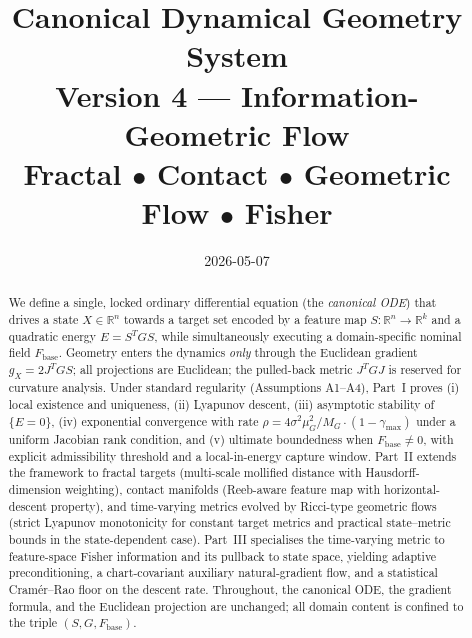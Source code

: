 \documentclass[11pt,oneside]{amsart}
\def\textbf#1{#1}%
\def\textmd#1{#1}%
\theoremstyle{plain}
\theoremstyle{definition}
\newcommand{\gX}{g_X}
\newcommand{\Fbase}{F_{\mathrm{base}}}
\newcommand{\R}{\mathbb{R}}
\begin{document}

\title[Canonical Dynamical Geometry System v4]{%
  \textbf{Canonical Dynamical Geometry System}\\[2pt]
  {\large Version 4 --- Information-Geometric Flow}\\[4pt]
  {\normalsize\textmd{Fractal $\bullet$ Contact $\bullet$ Geometric Flow $\bullet$ Fisher}}
}
\author{} \date{2026-05-07}

\begin{abstract}
We define a single, locked ordinary differential equation (the
\emph{canonical ODE}) that drives a state $X\in\R^{n}$ towards a target set
encoded by a feature map $S:\R^{n}\!\to\!\R^{k}$ and a quadratic energy
$E = S^{T}GS$, while simultaneously executing a domain-specific nominal
field $\Fbase$. Geometry enters the dynamics \emph{only} through the
Euclidean gradient $\gX = 2J^{T}GS$; all projections are Euclidean; the
pulled-back metric $J^{T}GJ$ is reserved for curvature analysis. Under
standard regularity (Assumptions A1--A4), Part~I proves (i) local
existence and uniqueness, (ii) Lyapunov descent, (iii) asymptotic
stability of $\{E=0\}$, (iv) exponential convergence with rate
$\rho = 4\sigma^{2}\mu_{G}^{2}/M_{G}\cdot(1-\gamma_{\max})$ under a
uniform Jacobian rank condition, and (v) ultimate boundedness when
$\Fbase\neq 0$, with explicit admissibility threshold and a local-in-energy
capture window. Part~II extends
the framework to fractal targets (multi-scale mollified distance with
Hausdorff-dimension weighting), contact manifolds (Reeb-aware feature
map with horizontal-descent property), and time-varying metrics evolved
by Ricci-type geometric flows (strict Lyapunov monotonicity for
constant target metrics and practical state--metric bounds in the
state-dependent case). Part~III specialises the time-varying metric to
feature-space Fisher information and its pullback to state space,
yielding adaptive preconditioning, a chart-covariant auxiliary
natural-gradient flow, and a statistical
Cram\'er--Rao floor on the descent rate. Throughout, the canonical ODE,
the gradient formula, and the Euclidean projection are unchanged; all
domain content is confined to the triple $(S,G,\Fbase)$.
\end{abstract}

\maketitle
\thispagestyle{plain}
\end{document}
